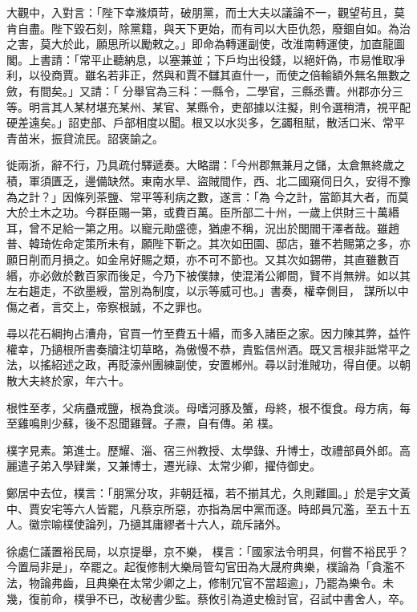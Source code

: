 \begin{pinyinscope}
 大觀中，入對言：「陛下幸滌煩苛，破朋黨，而士大夫以議論不一，觀望茍且，莫肯自盡。陛下毀石刻，除黨籍，與天下更始，而有司以大臣仇怨，廢錮自如。為治之害，莫大於此，願思所以勵敕之。」即命為轉運副使，改淮南轉運使，加直龍圖閣。上書請：「常平止聽納息，以塞兼並；下戶均出役錢，以絕奸偽，市易惟取凈利，以役商賈。雖名若非正，然與和賈不讎其直什一，而使之倍輸額外無名無數之斂，有間矣。」又請：「
 分舉官為三科：一縣令，二學官，三縣丞曹。州郡亦分三等。明言其人某材堪充某州、某官、某縣令，吏部據以注擬，則令選稍清，視平配硬差遠矣。」詔吏部、戶部相度以聞。根又以水災多，乞蠲租賦，散活口米、常平青苗米，振貸流民。詔褒諭之。



 徙兩浙，辭不行，乃具疏付驛遞奏。大略謂：「今州郡無兼月之儲，太倉無終歲之積，軍須匱乏，邊備缺然。東南水旱、盜賊間作，西、北二國窺伺日久，安得不豫為之計？」因條列茶鹽、常平等利病之數，遂言：「為
 今之計，當節其大者，而莫大於土木之功。今群臣賜一第，或費百萬。臣所部二十州，一歲上供財三十萬緡耳，曾不足給一第之用。以寵元勛盛德，猶慮不稱，況出於閭閻干澤者哉。雖趙普、韓琦佐命定策所未有，願陛下靳之。其次如田園、邸店，雖不若賜第之多，亦願日削而月損之。如金帛好賜之類，亦不可不節也。又其次如錫帶，其直雖數百緡，亦必斂於數百家而後足，今乃下被僕隸，使混淆公卿間，賢不肖無辨。如以其左右趨走，不欲墨綬，當別為制度，以示等威可也。」書奏，權幸側目，
 謀所以中傷之者，言交上，帝察根誠，不之罪也。



 尋以花石綱拘占漕舟，官買一竹至費五十緡，而多入諸臣之家。因力陳其弊，益忤權幸，乃擿根所書奏牘注切草略，為傲慢不恭，責監信州酒。既又言根非詆常平之法，以搖紹述之政，再貶濠州團練副使，安置郴州。尋以討淮賊功，得自便。以朝散大夫終於家，年六十。



 根性至孝，父病蠱戒鹽，根為食淡。母嗜河豚及蟹，母終，根不復食。母方病，每至雞鳴則少蘇，後不忍聞雞聲。子燾，自有傳。弟
 樸。



 樸字見素。第進士。歷耀、淄、宿三州教授、太學錄、升博士，改禮部員外郎。高麗遣子弟入學肄業，又兼博士，遷光祿、太常少卿，擢侍御史。



 鄭居中去位，樸言：「朋黨分攻，非朝廷福，若不揃其尤，久則難圖。」於是宇文黃中、賈安宅等六人皆罷，凡蔡京所惡，亦指為居中黨而逐。時郎員冗濫，至五十五人。徽宗喻樸使論列，乃擿其庸繆者十六人，疏斥諸外。



 徐處仁議置裕民局，以京提舉，京不樂，
 樸言：「國家法令明具，何嘗不裕民乎？今置局非是」，卒罷之。起復修制大樂局管勾官田為大晟府典樂，樸論為「貪濫不法，物論弗齒，且典樂在太常少卿之上，修制冗官不當超逾」，乃罷為樂令。未幾，復前命，樸爭不已，改秘書少監。蔡攸引為道史檢討官，召試中書舍人，卒。




\end{pinyinscope}
